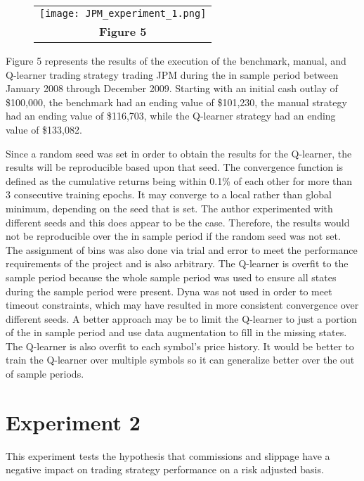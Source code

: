 \documentclass[
	letterpaper, %
]{jdf}
\begin{document}
\begin{figure}[h]
	\begin{tabular}{c}
		\texttt{[image: JPM\_experiment\_1.png]} \\
		\textbf{Figure 5} \\ 
	\end{tabular}
\end{figure}

Figure 5 represents the results of the execution of the benchmark, manual, and Q-learner trading strategy trading JPM during the in sample period between January 2008 through December 2009.  Starting with an initial cash outlay of \$100,000, the benchmark had an ending value of \$101,230, the manual strategy had an ending value of \$116,703, while the Q-learner strategy had an ending value of \$133,082. 

Since a random seed was set in order to obtain the results for the Q-learner, the results will be reproducible based upon that seed.  The convergence function is defined as the cumulative returns being within 0.1\% of each other for more than 3 consecutive training epochs.  It may converge to a local rather than global minimum, depending on the seed that is set.  The author experimented with different seeds and this does appear to be the case.  Therefore, the results would not be reproducible over the in sample period if the random seed was not set.  The assignment of bins was also done via trial and error to meet the performance requirements of the project and is also arbitrary. The Q-learner is overfit to the sample period because the whole sample period was used to ensure all states during the sample period were present.  Dyna was not used in order to meet timeout constraints, which may have resulted in more consistent convergence over different seeds.  A better approach may be to limit the Q-learner to just a portion of the in sample period and use data augmentation to fill in the missing states.  The Q-learner is also overfit to each symbol's price history.  It would be better to train the Q-learner over multiple symbols so it can generalize better over the out of sample periods.

\section{Experiment 2}

This experiment tests the hypothesis that commissions and slippage have a negative impact on trading strategy performance on a risk adjusted basis. 
\end{document}

